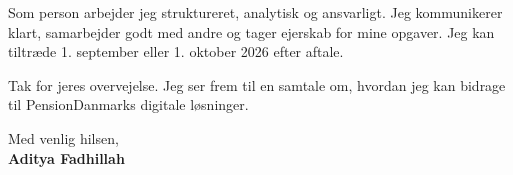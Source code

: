 \documentclass[a4paper,12pt]{article}
\begin{document}
\vspace{0.2cm}

\noindent
Som person arbejder jeg struktureret, analytisk og ansvarligt. Jeg kommunikerer klart, samarbejder godt med andre og tager ejerskab for mine opgaver. Jeg kan tiltræde 1. september eller 1. oktober 2026 efter aftale.

\vspace{0.3cm}

\noindent
Tak for jeres overvejelse. Jeg ser frem til en samtale om, hvordan jeg kan bidrage til PensionDanmarks digitale løsninger.

\vspace{0.5cm}

\noindent
Med venlig hilsen,\\[0.4cm]
\textbf{Aditya Fadhillah}
\end{document}
